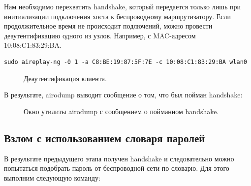\documentclass[10pt,a4paper]{report}
\begin{document}
Нам необходимо перехватить handshake, который передается только лишь при инитиализации подключения хоста к беспроводному маршрутизатору. Если продолжительное время не происходит подлючений, можно провести деаутентификацию одного из узлов. Например, с MAC-адресом 10:08:C1:83:29:BA.

\begin{verbatim}
sudo aireplay-ng -0 1 -a C8:BE:19:87:5F:7E -c 10:08:C1:83:29:BA wlan0
\end{verbatim}

\begin{figure}[h!]	
	\caption{Деаутентификация клиента.}
	\label{Img:4}
\end{figure}

В результате, airodump выводит сообщение о том, что был пойман handshake:

\begin{figure}[h!]	
	\caption{Окно утилиты airodump с сообщением о пойманном handshake.}
	\label{Img:5}
\end{figure}
\pagebreak

\subsection{Взлом с использованием словаря паролей}
В результате предыдущего этапа получен handshake и следовательно можно попытаться подобрать пароль от беспроводной сети по словарю. Для этого выполним следующую команду:
\end{document}
